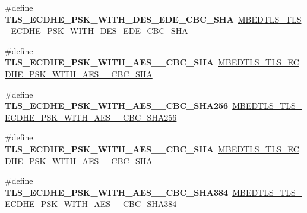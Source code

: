 \begin{DoxyCompactItemize}
\item 
\mbox{\label{compat-1_83_8h_a0c18bbcf880ea34838112d753fa1a8ad}} 
\#define {\bfseries T\+L\+S\+\_\+\+E\+C\+D\+H\+E\+\_\+\+P\+S\+K\+\_\+\+W\+I\+T\+H\+\_\+D\+E\+S\+\_\+\+E\+D\+E\+\_\+\+C\+B\+C\+\_\+\+S\+HA}~\mbox{\hyperlink{ssl__ciphersuites_8h_ab07c4acb23fbd7abbfd1e28b7b015453}{M\+B\+E\+D\+T\+L\+S\+\_\+\+T\+L\+S\+\_\+\+E\+C\+D\+H\+E\+\_\+\+P\+S\+K\+\_\+\+W\+I\+T\+H\+\_\+D\+E\+S\+\_\+\+E\+D\+E\+\_\+\+C\+B\+C\+\_\+\+S\+HA}}
\item 
\mbox{\label{compat-1_83_8h_a21c57f86ab2bb68a2436ecddaf69a7b4}} 
\#define {\bfseries T\+L\+S\+\_\+\+E\+C\+D\+H\+E\+\_\+\+P\+S\+K\+\_\+\+W\+I\+T\+H\+\_\+\+A\+E\+S\+\_\+\_\+\+C\+B\+C\+\_\+\+S\+HA}~\mbox{\hyperlink{ssl__ciphersuites_8h_a5e96a17bad57e86ec12f40f1107788b6}{M\+B\+E\+D\+T\+L\+S\+\_\+\+T\+L\+S\+\_\+\+E\+C\+D\+H\+E\+\_\+\+P\+S\+K\+\_\+\+W\+I\+T\+H\+\_\+\+A\+E\+S\+\_\+\_\+\+C\+B\+C\+\_\+\+S\+HA}}
\item 
\mbox{\label{compat-1_83_8h_adc45f48d71a6fd3c0d3bfd46dc4dfabf}} 
\#define {\bfseries T\+L\+S\+\_\+\+E\+C\+D\+H\+E\+\_\+\+P\+S\+K\+\_\+\+W\+I\+T\+H\+\_\+\+A\+E\+S\+\_\+\_\+\+C\+B\+C\+\_\+\+S\+H\+A256}~\mbox{\hyperlink{ssl__ciphersuites_8h_a97a69259835f6891d51813068f084ef5}{M\+B\+E\+D\+T\+L\+S\+\_\+\+T\+L\+S\+\_\+\+E\+C\+D\+H\+E\+\_\+\+P\+S\+K\+\_\+\+W\+I\+T\+H\+\_\+\+A\+E\+S\+\_\+\_\+\+C\+B\+C\+\_\+\+S\+H\+A256}}
\item 
\mbox{\label{compat-1_83_8h_a17ca9c450c5228938a75f964f90db9cb}} 
\#define {\bfseries T\+L\+S\+\_\+\+E\+C\+D\+H\+E\+\_\+\+P\+S\+K\+\_\+\+W\+I\+T\+H\+\_\+\+A\+E\+S\+\_\+\_\+\+C\+B\+C\+\_\+\+S\+HA}~\mbox{\hyperlink{ssl__ciphersuites_8h_acb735791d25d93a6aefe489c6795f9fa}{M\+B\+E\+D\+T\+L\+S\+\_\+\+T\+L\+S\+\_\+\+E\+C\+D\+H\+E\+\_\+\+P\+S\+K\+\_\+\+W\+I\+T\+H\+\_\+\+A\+E\+S\+\_\+\_\+\+C\+B\+C\+\_\+\+S\+HA}}
\item 
\mbox{\label{compat-1_83_8h_a19782b5bb8923092f3268f6ce5ef2f76}} 
\#define {\bfseries T\+L\+S\+\_\+\+E\+C\+D\+H\+E\+\_\+\+P\+S\+K\+\_\+\+W\+I\+T\+H\+\_\+\+A\+E\+S\+\_\+\_\+\+C\+B\+C\+\_\+\+S\+H\+A384}~\mbox{\hyperlink{ssl__ciphersuites_8h_a6eaae8a34db3908aa0ca1dd0bfd34f26}{M\+B\+E\+D\+T\+L\+S\+\_\+\+T\+L\+S\+\_\+\+E\+C\+D\+H\+E\+\_\+\+P\+S\+K\+\_\+\+W\+I\+T\+H\+\_\+\+A\+E\+S\+\_\+\_\+\+C\+B\+C\+\_\+\+S\+H\+A384}}

\end{DoxyCompactItemize}
